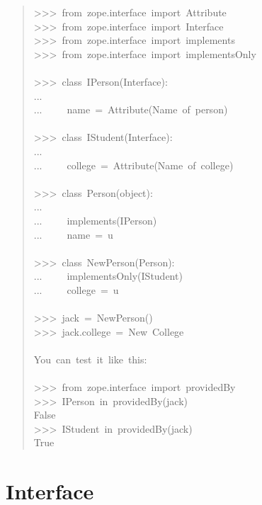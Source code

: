 \documentclass[14pt,a4paper,openany,twoside,final]{extbook}
\begin{document}
\begin{quote}{\ttfamily \raggedright \noindent
>{}>{}>~from~zope.interface~import~Attribute\\
>{}>{}>~from~zope.interface~import~Interface\\
>{}>{}>~from~zope.interface~import~implements\\
>{}>{}>~from~zope.interface~import~implementsOnly\\
~\\
>{}>{}>~class~IPerson(Interface):\\
...\\
...~~~~~name~=~Attribute(\textquotedbl{}Name~of~person\textquotedbl{})\\
~\\
>{}>{}>~class~IStudent(Interface):\\
...\\
...~~~~~college~=~Attribute(\textquotedbl{}Name~of~college\textquotedbl{})\\
~\\
>{}>{}>~class~Person(object):\\
...\\
...~~~~~implements(IPerson)\\
...~~~~~name~=~u\textquotedbl{}\textquotedbl{}\\
~\\
>{}>{}>~class~NewPerson(Person):\\
...~~~~~implementsOnly(IStudent)\\
...~~~~~college~=~u\textquotedbl{}\textquotedbl{}\\
~\\
>{}>{}>~jack~=~NewPerson()\\
>{}>{}>~jack.college~=~\textquotedbl{}New~College\textquotedbl{}\\
~\\
You~can~test~it~like~this:\\
~\\
>{}>{}>~from~zope.interface~import~providedBy\\
>{}>{}>~IPerson~in~providedBy(jack)\\
False\\
>{}>{}>~IStudent~in~providedBy(jack)\\
True
}
\end{quote}


\section*{Interface%
  \label{interface}%
}
\end{document}

